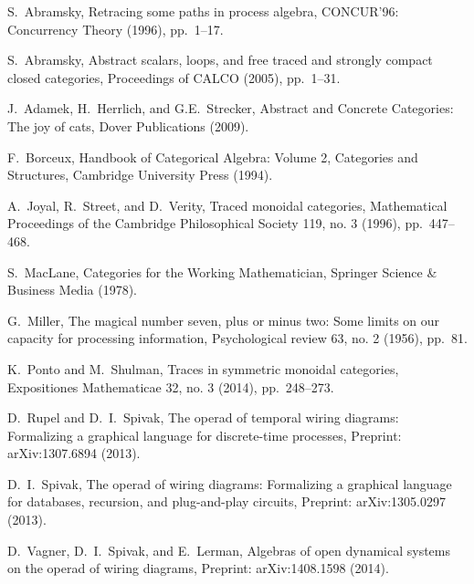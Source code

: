 \documentclass[12pt,oneside,article,draft]{memoir}
\begin{document}
\begin{thebibliography}{XXX}
 S.~Abramsky, Retracing some paths in process algebra, CONCUR'96: Concurrency Theory (1996), pp.~1--17.

 S.~Abramsky, Abstract scalars, loops, and free traced and strongly compact closed categories, Proceedings of CALCO (2005), pp.~1--31.

 J.~Adamek, H.~Herrlich, and G.E.~Strecker, Abstract and Concrete Categories: The joy of cats, Dover Publications (2009).

 F.~Borceux, Handbook of Categorical Algebra: Volume 2, Categories and Structures, Cambridge University Press (1994).

 A.~Joyal, R.~Street, and D.~Verity, Traced monoidal categories, Mathematical Proceedings of the Cambridge Philosophical Society 119, no. 3 (1996), pp.~447--468.

 S.~MacLane, Categories for the Working Mathematician, Springer Science \& Business Media (1978).

 G.~Miller, The magical number seven, plus or minus two: Some limits on our capacity for processing information, Psychological review 63, no. 2 (1956), pp.~81.

 K.~Ponto and M.~Shulman, Traces in symmetric monoidal categories, Expositiones Mathematicae 32, no. 3 (2014), pp.~248--273.

 D.~Rupel and D.~I.~Spivak, The operad of temporal wiring diagrams: Formalizing a graphical language for discrete-time processes, Preprint: arXiv:1307.6894 (2013).

 D.~I.~Spivak, The operad of wiring diagrams: Formalizing a graphical language for databases, recursion, and plug-and-play circuits, Preprint: arXiv:1305.0297 (2013).

 D.~Vagner, D.~I.~Spivak, and E.~Lerman, Algebras of open dynamical systems on the operad of wiring diagrams, Preprint: arXiv:1408.1598 (2014).

\end{thebibliography}
\end{document}
